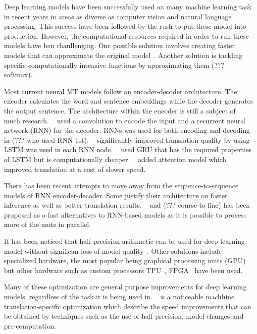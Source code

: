 \documentclass[]{article}
\begin{document}
Deep learning models have been successfully used on many machine learning task in recent years in areas as diverse as computer vision and natural language processing. This success have been followed by the rush to put these model into production. However, the computational resources required in order to run these models have ben chanllenging. One possible solution involves creating faster models that can approximate the original model~\citep{DBLP:conf/emnlp/KimR16}. Another solution is tackling specific computationally intensive functions by approximating them (??? softmax). 

Most current neural MT models follow an encoder-decoder architecture. The encoder calculates the word and sentence embeddings while the decoder generates the output sentence. The architecture within the encoder is still a subject of much research. ~\cite{kalchbrenner13emnlp} used a convolution to encode the input and a recurrent neural network (RNN) for the decoder. RNNs was used for both encoding and decoding in (??? who used RNN 1st). ~\cite{Sutskever:2014:SSL:2969033.2969173} significantly improved translation quality by using LSTM was used in each RNN node. ~\cite{D14-1179} used GRU that has the required properties of LSTM but is computationally cheaper. ~\cite{DBLP:journals/corr/BahdanauCB14} added attention model which improved translation at a cost of slower speed.

There has been recent attempts to move away from the sequence-to-sequence models of RNN encoder-decoder. Some justify their architecture on faster inference as well as better translation results. ~\cite{DBLP:journals/corr/VaswaniSPUJGKP17} and (??? course-to-fine) has been proposed as a fast alternatives to RNN-based models as it is possible to process more of the units in parallel.

It has been noticed that half precision arithmetic can be used for deep learning model without significan loss of model quality~\citep{DBLP:journals/corr/abs-1710-03740}. Other solutions include specialized hardware, the most popular being graphical processing units (GPU) but other hardware such as custom processors TPU~\citep{DBLP:journals/corr/JouppiYPPABBBBB17}, FPGA~\citep{DBLP:journals/corr/LaceyTA16} have been used. 

Many of these optimization are general purpose improvements for deep learning models, regardless of the task it is being used in. ~\cite{DBLP:conf/emnlp/Devlin17} is a noticeable machhine translation-specific optimization which describe the speed improvements that can be obtained by techniques such as the use of half-precision, model changes and pre-computation.
\end{document}
